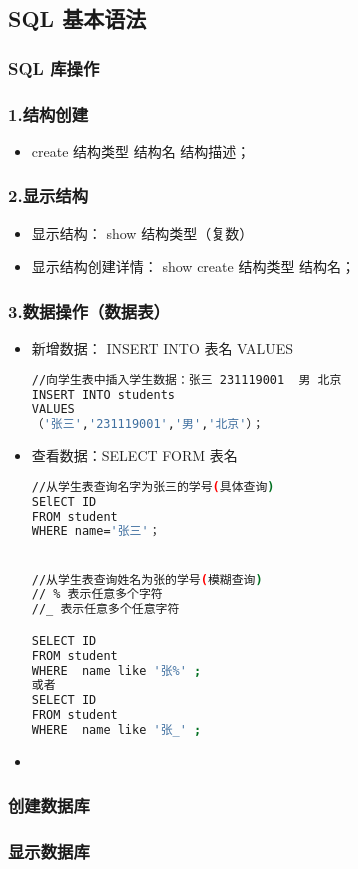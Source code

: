 
\begin{issues}
\issueDraft
\end{issues}

\subsection{SQL 基本语法}

\subsubsection{SQL 库操作}
\subsubsection{1.结构创建}
\begin{itemize}
\item create 结构类型 结构名 结构描述；
\end{itemize}
\subsubsection{2.显示结构}
\begin{itemize}
\item 显示结构： show 结构类型（复数）
\item 显示结构创建详情： show create 结构类型 结构名；
\end{itemize}
\subsubsection{3.数据操作（数据表）}
\begin{itemize}
\item 新增数据： INSERT INTO 表名 VALUES
\begin{lstlisting}[language=bash]
//向学生表中插入学生数据：张三 231119001  男 北京
INSERT INTO students
VALUES
（'张三','231119001','男','北京'）；
\end{lstlisting}

\item 查看数据：SELECT FORM 表名 
\begin{lstlisting}[language=bash]
//从学生表查询名字为张三的学号(具体查询)
SElECT ID
FROM student
WHERE name='张三'；


//从学生表查询姓名为张的学号(模糊查询)
// % 表示任意多个字符
//_ 表示任意多个任意字符

SELECT ID
FROM student
WHERE  name like '张%' ;
或者
SELECT ID
FROM student
WHERE  name like '张_' ;
\end{lstlisting}
\item 
\end{itemize}



\subsubsection{创建数据库}
\subsubsection{显示数据库}
